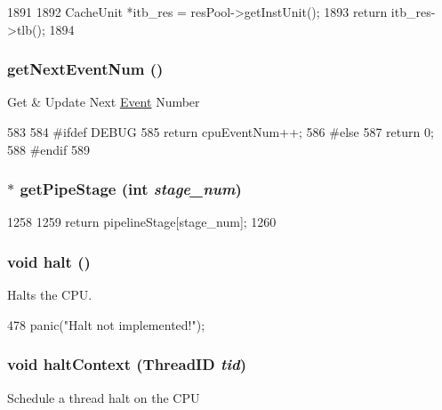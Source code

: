 \begin{DoxyCode}
1891 {
1892     CacheUnit *itb_res = resPool->getInstUnit();
1893     return itb_res->tlb();
1894 }
\end{DoxyCode}
\hypertarget{classInOrderCPU_ad382338533a75c038ece93a49091c9ca}{
\subsubsection[{getNextEventNum}]{ getNextEventNum ()}}
\label{classInOrderCPU_ad382338533a75c038ece93a49091c9ca}
Get \& Update Next \hyperlink{classEvent}{Event} Number 


\begin{DoxyCode}
583     {
584 #ifdef DEBUG
585         return cpuEventNum++;
586 #else
587         return 0;
588 #endif
589     }
\end{DoxyCode}
\hypertarget{classInOrderCPU_a4354c88eea8c78cc39d43d8c5f4c6b46}{
\subsubsection[{getPipeStage}]{ $\ast$ getPipeStage (int {\em stage\_\-num})}}
\label{classInOrderCPU_a4354c88eea8c78cc39d43d8c5f4c6b46}



\begin{DoxyCode}
1258 {
1259     return pipelineStage[stage_num];
1260 }
\end{DoxyCode}
\hypertarget{classInOrderCPU_ade0430439247877006d7df950f94918a}{
\subsubsection[{halt}]{\setlength{\rightskip}{0pt plus 5cm}void halt ()}}
\label{classInOrderCPU_ade0430439247877006d7df950f94918a}
Halts the CPU. 


\begin{DoxyCode}
478 { panic("Halt not implemented!\n"); }
\end{DoxyCode}
\hypertarget{classInOrderCPU_ac2156e0955d5e1ef6e06cd0e2ab218e4}{
\subsubsection[{haltContext}]{\setlength{\rightskip}{0pt plus 5cm}void haltContext ({\bf ThreadID} {\em tid})}}
\label{classInOrderCPU_ac2156e0955d5e1ef6e06cd0e2ab218e4}
Schedule a thread halt on the CPU 


